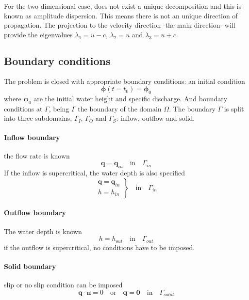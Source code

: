 For the two dimensional case, does not exist a unique decomposition and this is known as amplitude dispersion. This means there is not an unique direction of propagation. The projection to the velocity direction -the main direction- will provide the eigenvalues $\lambda_1 = u - c$, $\lambda_2 = u$ and $\lambda_3 = u + c$.


\subsection{Boundary conditions}

The problem is closed with appropriate boundary conditions: an initial condition
\begin{equation}
\bm{\phi}(t=t_0) = \bm{\phi}_0
\end{equation}
where $\bm{\phi}_0$ are the initial water height and specific discharge. And boundary conditions at $\Gamma$, being $\Gamma$ the boundary of the domain $\Omega$. The boundary $\Gamma$ is split into three subdomains, $\Gamma_I$, $\Gamma_O$ and $\Gamma_S$: inflow, outflow and solid.
\paragraph{Inflow boundary} the flow rate is known
\begin{equation*}
    \mathbf{q} = \mathbf{q}_{in} \quad \text{in} \quad \Gamma_{in}
\end{equation*}
If the inflow is supercritical, the water depth is also specified
\begin{equation*}
    \left.\begin{matrix}
    \mathbf{q} = \mathbf{q}_{in} \\
    h = h_{in}
    \end{matrix}\right\}
    \quad \text{in} \quad \Gamma_{in}
\end{equation*}


\paragraph{Outflow boundary} The water depth is known
\begin{equation*}
    h = h_{out} \quad \text{in} \quad \Gamma_{out}
\end{equation*}
if the outflow is supercritical, no conditions have to be imposed.


\paragraph{Solid boundary} slip or no slip condition can be imposed
\begin{equation*}
    \mathbf{q} \cdot \mathbf{n} = 0 \quad \text{or} \quad \mathbf{q} = \mathbf{0} \quad \text{in} \quad \Gamma_{solid}
\end{equation*}





